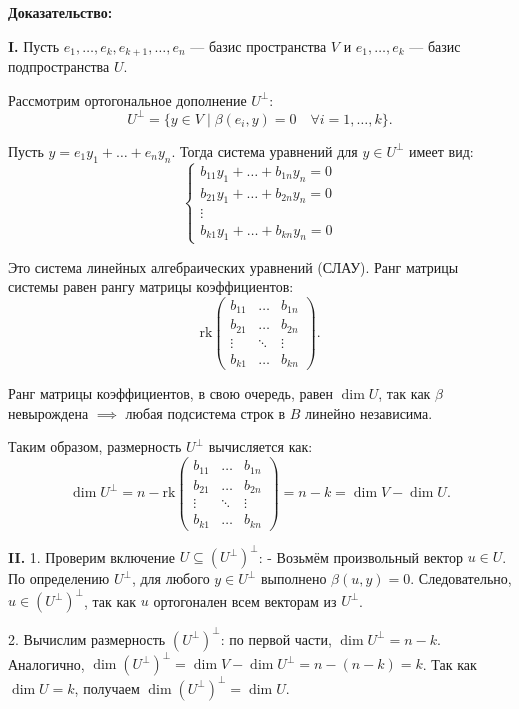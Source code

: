 \documentclass[12pt]{article}
\begin{document}
\textbf{Доказательство:}

\textbf{I.} Пусть $ e_1, \dots, e_k, e_{k+1}, \dots, e_n $ — базис пространства $ V $ и $ e_1, \dots, e_k $ — базис подпространства $ U $.

Рассмотрим ортогональное дополнение $ U^\perp $:
\[
U^\perp = \{ y \in V \mid \beta(e_i, y) = 0 \quad \forall i = 1, \dots, k \}.
\]

Пусть $ y = e_1 y_1 + \dots + e_n y_n $. Тогда система уравнений для $ y \in U^\perp $ имеет вид:
\[
\begin{cases}
b_{11} y_1 + \dots + b_{1n} y_n = 0 \\
b_{21} y_1 + \dots + b_{2n} y_n = 0 \\
\vdots \\
b_{k1} y_1 + \dots + b_{kn} y_n = 0
\end{cases}
\]

Это система линейных алгебраических уравнений (СЛАУ). Ранг матрицы системы равен рангу матрицы коэффициентов:
\[
\mathrm{rk} \begin{pmatrix}
b_{11} & \dots & b_{1n} \\
b_{21} & \dots & b_{2n} \\
\vdots & \ddots & \vdots \\
b_{k1} & \dots & b_{kn}
\end{pmatrix}.
\]

Ранг матрицы коэффициентов, в свою очередь, равен $\dim U$, так как $\beta$ невырождена $\implies$ любая подсистема строк в $B$ линейно независима.

Таким образом, размерность $ U^\perp $ вычисляется как:
\[
\dim U^\perp = n - \mathrm{rk} \begin{pmatrix}
b_{11} & \dots & b_{1n} \\
b_{21} & \dots & b_{2n} \\
\vdots & \ddots & \vdots \\
b_{k1} & \dots & b_{kn}
\end{pmatrix} = n - k = \dim V - \dim U.
\]

\textbf{II.} 1. Проверим включение $ U \subseteq (U^\perp)^\perp $:
   - Возьмём произвольный вектор $ u \in U $. По определению $ U^\perp $, для любого $ y \in U^\perp $ выполнено $ \beta(u, y) = 0 $.
   Следовательно, $ u \in (U^\perp)^\perp $, так как $ u $ ортогонален всем векторам из $ U^\perp $.

2. Вычислим размерность $ (U^\perp)^\perp $:
   по первой части, $ \dim U^\perp = n - k $.
   Аналогично, $ \dim (U^\perp)^\perp = \dim V - \dim U^\perp = n - (n - k) = k $.
   Так как $ \dim U = k $, получаем $ \dim (U^\perp)^\perp = \dim U $.
\end{document}
